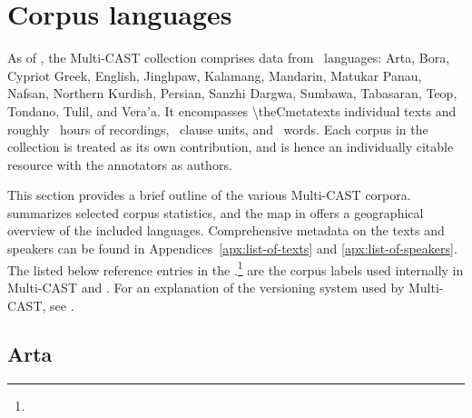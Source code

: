 
\section{Corpus languages}
\label{sec:corpora}

\sloppypar As of , the Multi-CAST collection comprises data from \theCmetacorpora\ languages: Arta, Bora, \mbox{Cypriot} Greek, English, Jinghpaw, Kalamang, Mandarin, Matukar Panau, Nafsan, Northern \mbox{Kurdish}, Persian, \mbox{Sanzhi} Dargwa, Sumbawa, \mbox{Tabasaran}, Teop, Tondano, Tulil, and Vera'a. It encompasses \num{\theCmetatexts} individual texts and roughly \ovhours\ hours of recordings, \ovclauses\ clause units, and \ovwords\ words. Each corpus in the collection is treated as its own contribution, and is hence an individually citable resource with the annotators as authors. %

This section provides a brief outline of the various Multi-CAST corpora.  summarizes selected corpus statistics, and the map in  offers a geographical overview of the included languages. Comprehensive metadata on the texts and speakers can be found in Appendices~\ref{apx:list-of-texts} and \ref{apx:list-of-speakers}.
%
The  listed below reference entries in the  .\footnote{}  are the corpus labels used internally in Multi-CAST and . For an explanation of the versioning system used by Multi-CAST, see .







\subsection{Arta}
\label{ssec:corpus-arta}

